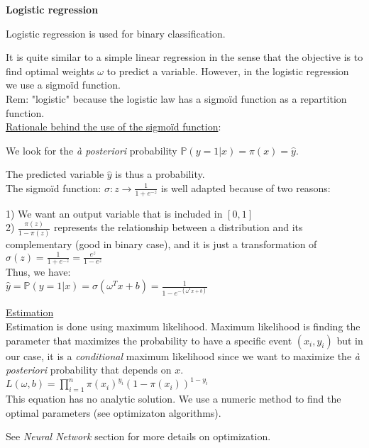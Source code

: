 {\fontsize{12pt}{22pt} \textbf{Logistic regression}\par}

\vspace{5mm}

Logistic regression is used for binary classification.

It is quite similar to a simple linear regression in the sense that the objective is to find optimal weights $\omega$ to predict a variable. However, in the logistic regression we use a sigmoïd function.\\

Rem: "logistic" because the logistic law has a sigmoïd function as a repartition function.\\

\underline{Rationale behind the use of the sigmoïd function}:

We look for the \textit{à posteriori} probability $\mathbb{P}(y=1 | x) = \pi (x) = \hat{y}$.

The predicted variable $\hat{y}$ is thus a probability.  \\

The sigmoïd function: $\sigma: z \to \frac{1}{1+e^{-z}}$ is well adapted because of two reasons:

1) We want an output variable that is included in $[0,1]$ \\
2) $\frac{\pi(z)}{1-\pi(z)}$ represents the relationship between a distribution and its complementary (good in binary case), and it is just a transformation of $\sigma(z)=\frac{1}{1+e^{-z}}=\frac{e^z}{1-e^z}$ \\

Thus, we have: \\
$\hat{y} = \mathbb{P}(y=1 | x) = \sigma(\omega ^Tx + b) = \frac{1}{1-e^{-(\omega ^Tx + b)}}$

\vspace{5mm}

\underline{Estimation} \\
Estimation is done using maximum likelihood. Maximum likelihood is finding the parameter that maximizes the probability to have a specific event $(x_i, y_i)$ but in our case, it is a \textit{conditional} maximum likelihood since we want to maximize the \textit{à posteriori} probability that depends on $x$. \\

$L(\omega, b) = \prod_{i=1}^n \pi(x_i)^{y_i}(1-\pi(x_i))^{1-y_i}$ \\

This equation has no analytic solution. We use a numeric method to find the optimal parameters (see optimizaton algorithms).

See \textit{Neural Network} section for more details on optimization.

\vspace{5mm}